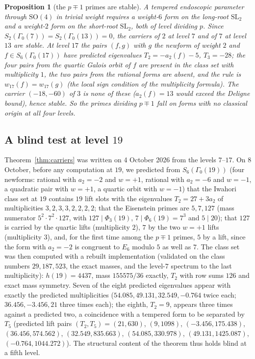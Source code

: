 \documentclass[11pt]{amsart}
\newtheorem{proposition}[theorem]{Proposition}
\theoremstyle{definition}
\begin{document}
\begin{proposition}[the $p\mp1$ primes are stable]\label{prop:stable}
A tempered endoscopic parameter through $\mathrm{SO}(4)$ in trivial weight requires a weight-$6$ form on the long-root $\mathrm{SL}_2$ and a weight-$2$ form on the short-root $\mathrm{SL}_2$, both of level dividing $p$. Since $S_2(\Gamma_0(7))=S_2(\Gamma_0(13))=0$, the carriers of $2$ at level $7$ and of $7$ at level $13$ are stable. At level $17$ the pairs $(f,g)$ with $g$ the newform of weight $2$ and $f\in S_6(\Gamma_0(17))$ have predicted eigenvalues $T_2=-a_2(f)-5$, $T_3=-28$; the four pairs from the quartic Galois orbit of $f$ are present in the class set with multiplicity $1$, the two pairs from the rational forms are absent, and the rule is $w_{17}(f)=w_{17}(g)$ (the local sign condition of the multiplicity formula). The carrier $(-18,-60)$ of $3$ is none of these ($a_2(f)=13$ would exceed the Deligne bound), hence stable. So the primes dividing $p\mp1$ fall on forms with no classical origin at all four levels.
\end{proposition}

\subsection{A blind test at level $19$}\label{sec:19}
Theorem~\ref{thm:carriers} was written on 4 October 2026 from the levels $7$--$17$. On 8 October, before any computation at $19$, we predicted from $S_6(\Gamma_0(19))$ (four newforms: rational with $a_2=-2$ and $w=+1$, rational with $a_2=-6$ and $w=-1$, a quadratic pair with $w=+1$, a quartic orbit with $w=-1$) that the Iwahori class set at $19$ contains $19$ lift slots with the eigenvalues $T_2=27+3a_2$ of multiplicities $3,2,3,3,2,2,2,2$; that the Eisenstein primes are $5,7,127$ (mass numerator $5^2\cdot7^2\cdot127$, with $127\mid\Phi_3(19)$, $7\mid\Phi_6(19)=7^3$ and $5\mid 20$); that $127$ is carried by the quartic lifts (multiplicity $2$), $7$ by the two $w=+1$ lifts (multiplicity $3$), and, for the first time among the $p\mp1$ primes, $5$ by a lift, since the form with $a_2=-2$ is congruent to $E_6$ modulo $5$ as well as $7$. The class set was then computed with a rebuilt implementation (validated on the class numbers $29,187,523$, the exact masses, and the level-$7$ spectrum to the last multiplicity): $h(19)=4437$, mass $155575/36$ exactly, $T_2$ with row sums $126$ and exact mass symmetry. Seven of the eight predicted eigenvalues appear with exactly the predicted multiplicities ($54.085,49.131,32.549,-0.764$ twice each; $36.456,-3.456,21$ three times each); the eighth, $T_2=9$, appears three times against a predicted two, a coincidence with a tempered form to be separated by $T_5$ (predicted lift pairs $(T_2,T_5)=(21,630)$, $(9,1098)$, $(-3.456,175.438)$, $(36.456,574.562)$, $(32.549,835.663)$, $(54.085,330.978)$, $(49.131,1425.087)$, $(-0.764,1044.272)$). The structural content of the theorem thus holds blind at a fifth level.
\end{document}
